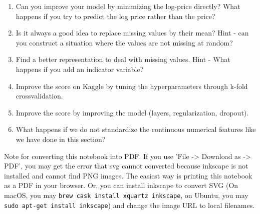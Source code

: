 \documentclass[11pt]{article}
\providecommand{\tightlist}{%
      \setlength{\itemsep}{0pt}\setlength{\parskip}{0pt}}
\begin{document}
\begin{enumerate}
\def\labelenumi{\arabic{enumi}.}
\tightlist
\item
  Can you improve your model by minimizing the log-price directly? What
  happens if you try to predict the log price rather than the price?
\item
  Is it always a good idea to replace missing values by their mean? Hint
  - can you construct a situation where the values are not missing at
  random?
\item
  Find a better representation to deal with missing values. Hint - What
  happens if you add an indicator variable?
\item
  Improve the score on Kaggle by tuning the hyperparameters through
  k-fold crossvalidation.
\item
  Improve the score by improving the model (layers, regularization,
  dropout).
\item
  What happens if we do not standardize the continuous numerical
  features like we have done in this section?
\end{enumerate}

Note for converting this notebook into PDF. If you use 'File
-\textgreater{} Download as -\textgreater{} PDF', you may get the error
that svg cannot converted because inkscape is not installed and cannot
find PNG images. The easiest way is printing this notebook as a PDF in
your browser. Or, you can install inkscape to convert SVG (On macOS, you
may \texttt{brew\ cask\ install\ xquartz\ inkscape}, on Ubuntu, you may
\texttt{sudo\ apt-get\ install\ inkscape}) and change the image URL to
local filenames.


    
    
    
    
\end{document}
